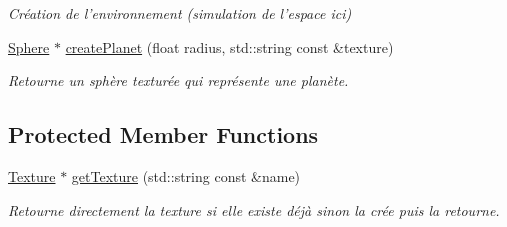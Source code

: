 \begin{DoxyCompactItemize}
\begin{DoxyCompactList}\small\item\em Création de l'environnement (simulation de l'espace ici) \end{DoxyCompactList}\item 
\hypertarget{classMeshFactory_a25c338f855f27bd73bbc7bd7b6a1bf7b}{\hyperlink{classSphere}{Sphere} $\ast$ \hyperlink{classMeshFactory_a25c338f855f27bd73bbc7bd7b6a1bf7b}{create\-Planet} (float radius, std\-::string const \&texture)}\label{classMeshFactory_a25c338f855f27bd73bbc7bd7b6a1bf7b}

\begin{DoxyCompactList}\small\item\em Retourne un sphère texturée qui représente une planète. \end{DoxyCompactList}\end{DoxyCompactItemize}
\subsection*{Protected Member Functions}
\begin{DoxyCompactItemize}
\item 
\hypertarget{classMeshFactory_ae8037c270e2e37be03cc5dcc7f5c5d58}{\hyperlink{classTexture}{Texture} $\ast$ \hyperlink{classMeshFactory_ae8037c270e2e37be03cc5dcc7f5c5d58}{get\-Texture} (std\-::string const \&name)}\label{classMeshFactory_ae8037c270e2e37be03cc5dcc7f5c5d58}

\begin{DoxyCompactList}\small\item\em Retourne directement la texture si elle existe déjà sinon la crée puis la retourne. \end{DoxyCompactList}\end{DoxyCompactItemize}
